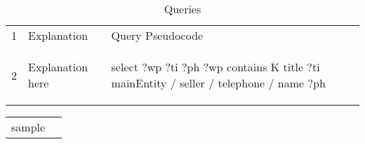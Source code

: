 

\begin{table} 
    \begin{tabular}{ l l l }
        1 & Explanation & Query Pseudocode\\ 
        2 & Explanation here & 
\begin{sparqlmini}
select ?wp ?ti ?ph
   ?wp contains K
      title ?ti
      mainEntity / seller / telephone / name ?ph
\end{sparqlmini}\\  
    \end{tabular} 
    \caption{Queries} 
\end{table}

\begin{tabular}{ ll }
sample &

\end{tabular}